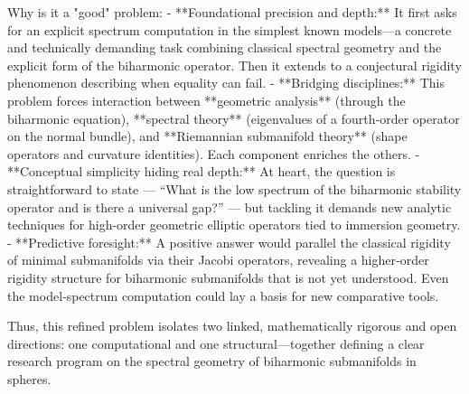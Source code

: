 Why is it a "good" problem:  
- **Foundational precision and depth:** It first asks for an explicit spectrum computation in the simplest known models—a concrete and technically demanding task combining classical spectral geometry and the explicit form of the biharmonic operator. Then it extends to a conjectural rigidity phenomenon describing when equality can fail.  
- **Bridging disciplines:** This problem forces interaction between **geometric analysis** (through the biharmonic equation), **spectral theory** (eigenvalues of a fourth‑order operator on the normal bundle), and **Riemannian submanifold theory** (shape operators and curvature identities). Each component enriches the others.  
- **Conceptual simplicity hiding real depth:** At heart, the question is straightforward to state — “What is the low spectrum of the biharmonic stability operator and is there a universal gap?” — but tackling it demands new analytic techniques for high-order geometric elliptic operators tied to immersion geometry.  
- **Predictive foresight:** A positive answer would parallel the classical rigidity of minimal submanifolds via their Jacobi operators, revealing a higher‑order rigidity structure for biharmonic submanifolds that is not yet understood. Even the model‑spectrum computation could lay a basis for new comparative tools.  

Thus, this refined problem isolates two linked, mathematically rigorous and open directions: one computational and one structural—together defining a clear research program on the spectral geometry of biharmonic submanifolds in spheres.